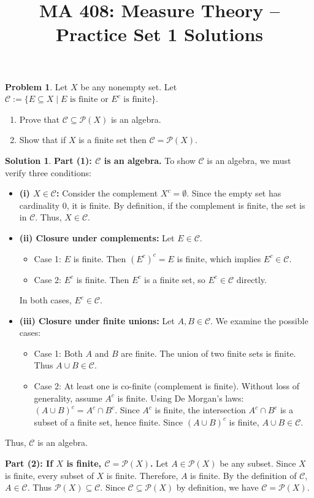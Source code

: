 \documentclass[11pt]{article}
\title{\textbf{MA 408: Measure Theory -- Practice Set 1 Solutions}}
\author{}
\date{}
\theoremstyle{definition}
\newtheorem{problem}{Problem}
\newtheorem*{solution}{Solution}
\newcommand{\C}{\mathcal{C}}
\newcommand{\Pset}{\mathcal{P}}
\begin{document}
\maketitle

\begin{problem}
Let $X$ be any nonempty set. Let $\C := \{E \subseteq X \mid E \text{ is finite or } E^c \text{ is finite}\}$.
\begin{enumerate}[label=(\arabic*)]
    \item Prove that $\C \subseteq \Pset(X)$ is an algebra.
    \item Show that if $X$ is a finite set then $\C = \Pset(X)$.
\end{enumerate}
\end{problem}

\begin{solution}
\textbf{Part (1): $\C$ is an algebra.}
To show $\C$ is an algebra, we must verify three conditions:
\begin{itemize}
    \item \textbf{(i) $X \in \C$:}
    Consider the complement $X^c = \emptyset$. Since the empty set has cardinality 0, it is finite. By definition, if the complement is finite, the set is in $\C$. Thus, $X \in \C$.

    \item \textbf{(ii) Closure under complements:}
    Let $E \in \C$.
    \begin{itemize}
        \item Case 1: $E$ is finite. Then $(E^c)^c = E$ is finite, which implies $E^c \in \C$.
        \item Case 2: $E^c$ is finite. Then $E^c$ is a finite set, so $E^c \in \C$ directly.
    \end{itemize}
    In both cases, $E^c \in \C$.

    \item \textbf{(iii) Closure under finite unions:}
    Let $A, B \in \C$. We examine the possible cases:
    \begin{itemize}
        \item Case 1: Both $A$ and $B$ are finite. The union of two finite sets is finite. Thus $A \cup B \in \C$.
        \item Case 2: At least one is co-finite (complement is finite). Without loss of generality, assume $A^c$ is finite.
        Using De Morgan's laws: $(A \cup B)^c = A^c \cap B^c$.
        Since $A^c$ is finite, the intersection $A^c \cap B^c$ is a subset of a finite set, hence finite.
        Since $(A \cup B)^c$ is finite, $A \cup B \in \C$.
    \end{itemize}
\end{itemize}
Thus, $\C$ is an algebra.

\textbf{Part (2): If $X$ is finite, $\C = \Pset(X)$.}
Let $A \in \Pset(X)$ be any subset. Since $X$ is finite, every subset of $X$ is finite. Therefore, $A$ is finite. By the definition of $\C$, $A \in \C$. Thus $\Pset(X) \subseteq \C$. Since $\C \subseteq \Pset(X)$ by definition, we have $\C = \Pset(X)$.
\end{solution}
\end{document}
